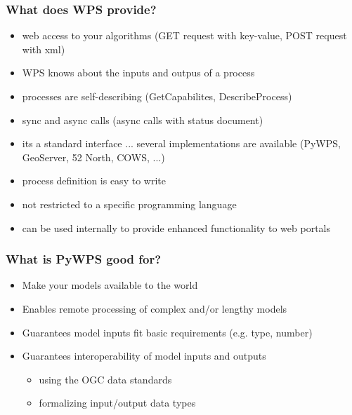 \documentclass{beamer}
\begin{document}
\begin{frame}
  \frametitle<presentation>{What does WPS provide?}
  \begin{itemize}
    \item web access to your algorithms (GET request with key-value, POST request with xml)
    \item WPS knows about the inputs and outpus of a process
    \item processes are self-describing (GetCapabilites, DescribeProcess)
    \item sync and async calls (async calls with status document)
    \item its a standard interface ... several implementations are available (PyWPS, GeoServer, 52 North, COWS, ...)
    \item process definition is easy to write
    \item not restricted to a specific programming language
    \item can be used internally to provide enhanced functionality to web portals
  \end{itemize}
\end{frame}

\begin{frame}
\frametitle{What is PyWPS good for?}

\begin{itemize}
  \item Make your models available to the world
  \item Enables remote processing of complex and/or lengthy models
  \item Guarantees model inputs fit basic requirements
        (e.g. type, number)
  \item Guarantees interoperability of model inputs and outputs
  \begin{itemize}
    \item using the OGC data standards
	\item formalizing input/output data types
  \end{itemize}
\end{itemize}
\end{frame}
\end{document}

